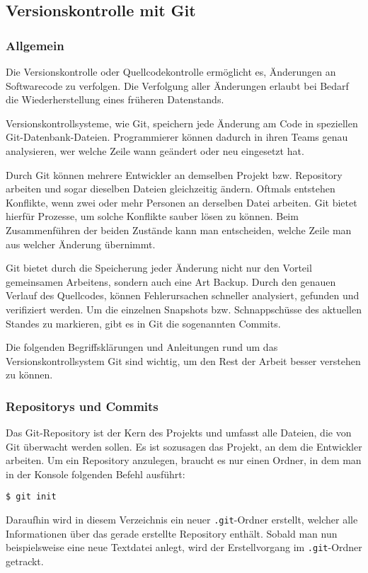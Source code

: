 \subsection{Versionskontrolle mit Git}
\subsubsection{Allgemein}
Die Versionskontrolle oder Quellcodekontrolle ermöglicht es, Änderungen an
Softwarecode zu verfolgen. Die Verfolgung aller Änderungen erlaubt bei Bedarf
die Wiederherstellung eines früheren Datenstands. \parencite{git-allgemein}

Versionskontrollsysteme, wie Git, speichern jede Änderung am Code in speziellen
Git-Datenbank-Dateien. Programmierer können dadurch in ihren Teams genau
analysieren, wer welche Zeile wann geändert oder neu eingesetzt hat.

Durch Git können mehrere Entwickler an demselben Projekt bzw. Repository
arbeiten und sogar dieselben Dateien gleichzeitig ändern. Oftmals entstehen
Konflikte, wenn zwei oder mehr Personen an derselben Datei arbeiten. Git bietet
hierfür Prozesse, um solche Konflikte sauber lösen zu können. Beim
Zusammenführen der beiden Zustände kann man entscheiden, welche Zeile man aus
welcher Änderung übernimmt.

Git bietet durch die Speicherung jeder Änderung nicht nur den Vorteil
gemeinsamen Arbeitens, sondern auch eine Art \glqq Backup\grqq{}. Durch den
genauen Verlauf des Quellcodes, können Fehlerursachen schneller analysiert,
gefunden und verifiziert werden. Um die einzelnen Snap\-shots bzw.
Schnappschüsse des aktuellen Standes zu markieren, gibt es in Git die
sogenannten Commits.

\newpage

Die folgenden Begriffsklärungen und Anleitungen rund um das
Versionskontrollsystem Git sind wichtig, um den Rest der Arbeit besser verstehen
zu können.

\subsubsection{Repositorys und Commits}
Das Git-Repository ist der Kern des Projekts und umfasst alle Dateien, die von
Git überwacht werden sollen. Es ist sozusagen das Projekt, an dem die Entwickler
arbeiten. Um ein Repository anzulegen, braucht es nur einen Ordner, in dem man
in der Konsole folgenden Befehl ausführt:
\begin{lstlisting}[style=Bash]
    $ git init
\end{lstlisting}
Daraufhin wird in diesem Verzeichnis ein neuer \texttt{.git}-Ordner erstellt,
welcher alle Informationen über das gerade erstellte Repository enthält. Sobald
man nun beispielsweise eine neue Textdatei anlegt, wird der Erstellvorgang im
\texttt{.git}-Ordner getrackt.

